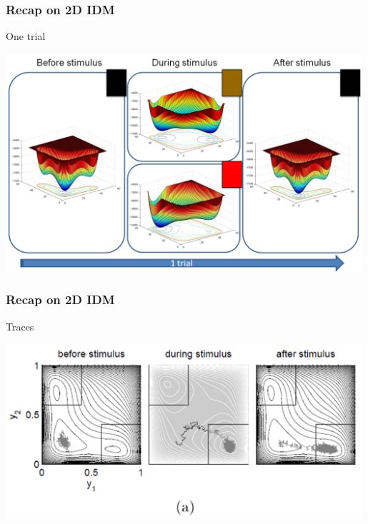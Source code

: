 \documentclass[xcolor={fixpdftex,hyperref,x11names},10pt,pdftex,hyperref={pdftex}]{beamer}
\begin{document}
\begin{frame}
    \frametitle{Recap on 2D IDM}
    One trial
        \begin{center}
            \includegraphics[width=0.99\textwidth]{figs/surface-trial.png}
        \end{center}
\end{frame}


\begin{frame}
    \frametitle{Recap on 2D IDM}
    Traces
        \begin{center}
            \includegraphics[width=0.99\textwidth]{figs/2D-trace.png}
        \end{center}
\end{frame}

\end{document}
